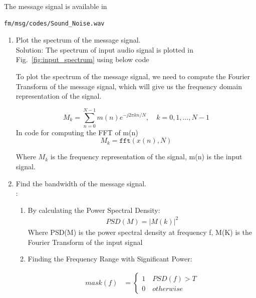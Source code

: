 \documentclass[12pt]{book}
\newcommand\figref{Fig.~\ref}
\renewcommand\thesection{\arabic{section}}
\begin{document}
The message signal is available in 
\begin{lstlisting}
fm/msg/codes/Sound_Noise.wav
\end{lstlisting}
\begin{enumerate}[label=\arabic*.,ref=\thesection.\theenumi]
\item Plot the spectrum of the message signal.\\
Solution:
The spectrum of input audio signal is plotted in \figref{fig:input_spectrum} using below code

\begin{center}
\end{center}

To plot the spectrum of the message signal, we need to compute the Fourier Transform of the message signal, which will give us the frequency domain representation of the signal.

\begin{equation}
M_k = \sum_{n=0}^{N-1} m(n) e^{-j2\pi kn/N}, \quad k=0,1,\dots,N-1
\end{equation}
In code for computing the FFT of m(n)
\begin{equation}
M_k = \texttt{fft}(x(n), N)
\end{equation}

Where $M_k$ is the frequency representation of the signal, m(n) is the input signal. 
\item Find the bandwidth of the message signal.\\
\solution:
\begin {enumerate}
\item By calculating the Power Spectral Density: 
\begin{align*}
PSD(M)=\lvert M(k) \rvert^2 
\end{align*}
Where PSD(M) is the power spectral density at frequency f, M(K) is the Fourier Transform of the input signal

\item Finding the Frequency Range with Significant Power:

\begin{align*}
mask(f) &=
\begin{cases}
 1 \quad PSD(f) > T\\
0 \quad otherwise
\end{cases}
\end{align*}



\end{enumerate}
\end{enumerate}
\end{document}
